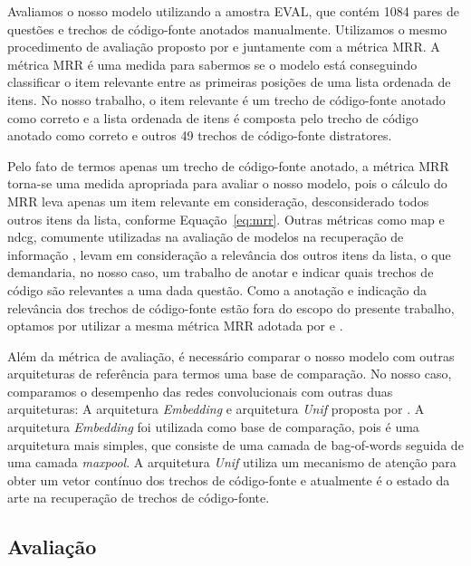 Avaliamos o nosso modelo utilizando a amostra EVAL, que contém 1084 pares de questões e trechos de código-fonte anotados manualmente. Utilizamos o mesmo procedimento de avaliação proposto por \cite{iyer-etal-2016-summarizing} e \cite{yao-2018} juntamente com a métrica MRR. A métrica MRR é uma medida para sabermos se o modelo está conseguindo classificar o item relevante entre as primeiras posições de uma lista ordenada de itens. 
No nosso trabalho, o item relevante é um trecho de código-fonte anotado como correto e a lista ordenada de itens é composta pelo trecho de código anotado como correto e outros 49 trechos de código-fonte distratores. 

Pelo fato de termos apenas um trecho de código-fonte anotado, a métrica MRR torna-se uma medida apropriada para avaliar o nosso modelo, pois o cálculo do MRR leva apenas um item relevante em consideração, desconsiderado todos outros itens da lista, conforme Equação~\ref{eq:mrr}. Outras métricas como \acrshort{map} e \acrshort{ndcg}, comumente utilizadas na avaliação de modelos na recuperação de informação \citep{kun-learning-to-rank:2018}, levam em consideração a relevância dos outros itens da lista, o que demandaria, no nosso caso, um trabalho de anotar e indicar quais trechos de código são relevantes a uma dada questão. Como a anotação e indicação da relevância dos trechos de código-fonte estão fora do escopo do presente trabalho, optamos por utilizar a mesma métrica MRR adotada por \cite{iyer-etal-2016-summarizing} e \cite{yao-2018}.

Além da métrica de avaliação, é necessário comparar o nosso modelo com outras arquiteturas de referência para termos uma base de comparação. No nosso caso, comparamos o desempenho das redes convolucionais com outras duas arquiteturas: A arquitetura \textit{Embedding} e arquitetura \textit{Unif} proposta por \cite{cambronero-deep-learning-code-search:2019}. A arquitetura \textit{Embedding} foi utilizada como base de comparação, pois é uma arquitetura mais simples, que consiste de uma camada de \gls{bag-of-words} seguida de uma camada \textit{maxpool}. A arquitetura \textit{Unif} utiliza um mecanismo de atenção para obter um vetor contínuo dos trechos de código-fonte e atualmente é o estado da arte na recuperação de trechos de código-fonte. 



\subsection{Avaliação}
\label{sec:avaliacao}

